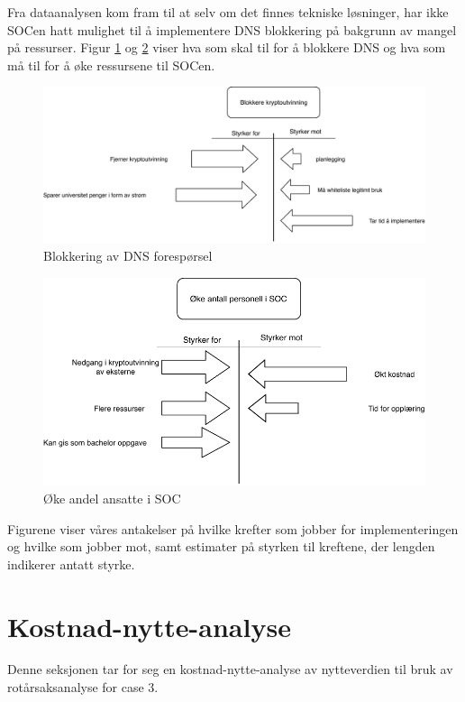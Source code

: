 Fra dataanalysen kom fram til at selv om det finnes tekniske løsninger, har ikke SOCen hatt mulighet til å implementere DNS blokkering på bakgrunn av mangel på ressurser. Figur \ref{fig:Blokkering} og \ref{fig:Oke-antall} viser hva som skal til for å blokkere DNS og hva som må til for å øke ressursene til SOCen.    
 \begin{figure}[H]
    \centering
    \includegraphics[scale=0.6]{case_3/bilder/Force-Field3.pdf}
    \caption[Blokkering]{Blokkering av DNS forespørsel}
    \label{fig:Blokkering}
\end{figure}

 \begin{figure}[H]
    \hspace{3.6cm}
    \includegraphics[scale=0.6]{case_3/bilder/Force-field4.pdf}
    \caption[Øke antall ansette i SOC]{Øke andel ansatte i SOC}
    \label{fig:Oke-antall}
\end{figure}

Figurene viser våres antakelser på hvilke krefter som jobber for implementeringen og hvilke som jobber mot, samt estimater på styrken til kreftene, der lengden indikerer antatt styrke. 
\section{Kostnad-nytte-analyse}
Denne seksjonen tar for seg en kostnad-nytte-analyse av nytteverdien til bruk av rotårsaksanalyse for case 3. 


